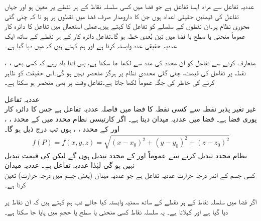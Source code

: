 
عددیہ تفاعل سے مراد ایسا تفاعل ہے جو فضا میں کسی سلسلہ نقاط کے ہر نقطے  پر معین ہو اور جہاں تفاعل کی قیمتیں حقیقی اعداد ہوں جن کا دارومدار صرف فضا میں نقطوں پر ہو نا کہ چنی گئی محوری نظام پر۔ان نقطوں کے سلسلے کو تفاعل کا  کہتے ہیں۔عملی استعمال میں تفاعل  کا دائرہ کار  عموماً  منحنی یا سطح یا فضا میں تین بُعدی خطہ ہو گا۔تفاعل  دائرہ کار  کے ہر نقطے کے ساتھ ایک عددیہ حقیقی عدد وابستہ کرتا ہے اور ہم کہتے ہیں کہ  میں  دیا گیا ہے۔

، ،  متعارف کرنے سے تفاعل  کو ان محدد کی مدد سے  لکھا جا سکتا ہے، پس اتنا یاد رہے کہ کسی بھی نقطہ  پر  تفاعل  کی قیمت، چنی گئی محددی نظام پر ہرگز منحصر نہیں ہو گی۔اس حقیقت کو ظاہر کرنے کی خاطر  کی جگہ عموماً  لکھا جاتا ہے۔تفاعل  وقت پر بھی منحصر ہو سکتا ہے۔

\quad عددیہ تفاعل\\
غیر تغیر پذیر نقطہ  سے  کسی نقطہ  کا فضا میں فاصلہ عددیہ تفاعل ہے جس کا دائرہ کار  پوری فضا ہے۔   فضا میں عددیہ میدان دیتا ہے۔ اگر کارتیسی نظام محدد میں  کے محدد ، ،  اور  کے محدد ، ،  ہوں تب  درج ذیل ہو گا۔
\begin{align*}
f(P)=f(x,y,z)=\sqrt{(x-x_0)^2+(y-y_0)^2+(z-z_0)^2}
\end{align*}
نظام محدد تبدیل کرنے سے عموماً  اور  کے محدد تبدیل ہوں گے لیکن  کی قیمت تبدیل نہیں ہو گی لہٰذا  عددیہ تفاعل ہے۔ 
\quad عددیہ میدان\\
کسی جسم کے اندر درجہ حرارت  عددیہ تفاعل ہے جو عددیہ میدان (یعنی جسم میں درجہ حرارت)  تعین کرتا ہے۔

اگر فضا میں  سلسلہ نقاط کے ہر نقطے  کے ساتھ سمتیہ  وابستہ کیا جائے تب ہم کہتے ہیں کہ ان نقاط پر  دیا گیا ہے اور   کہلاتا ہے۔  یہ سلسلہ نقاط کسی منحنی یا سطح یا حجم میں پایا جا سکتا ہے۔

